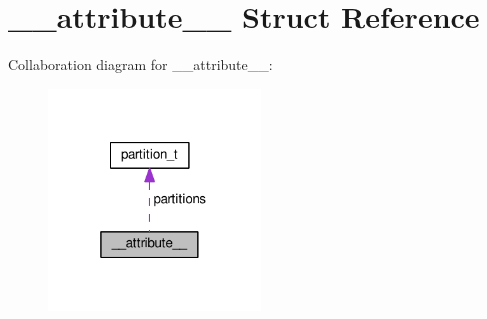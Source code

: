 \hypertarget{struct____attribute____}{}\section{\+\_\+\+\_\+attribute\+\_\+\+\_\+ Struct Reference}
\label{struct____attribute____}


Collaboration diagram for \+\_\+\+\_\+attribute\+\_\+\+\_\+\+:
\nopagebreak
\begin{figure}[H]
\begin{center}
\leavevmode
\includegraphics[width=160pt]{struct____attribute______coll__graph}
\end{center}
\end{figure}
